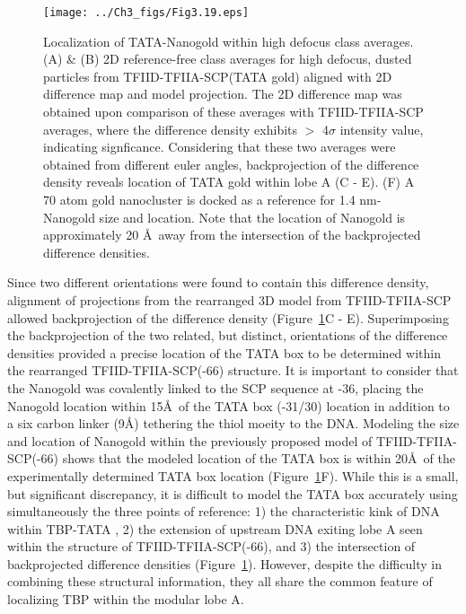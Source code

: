 \begin{figure}
\centering
\texttt{[image: ../Ch3\_figs/Fig3.19.eps]}
\caption[Localization of TATA-Nanogold within high defocus class averages]{Localization of TATA-Nanogold within high defocus class averages. (A) \& (B) 2D reference-free class averages for high defocus, dusted particles from TFIID-TFIIA-SCP(TATA gold) aligned with 2D difference map and model projection. The 2D difference map was obtained upon comparison of these averages with TFIID-TFIIA-SCP averages, where the difference density exhibits $>$ 4$\sigma$ intensity value, indicating signficance. Considering that these two averages were obtained from different euler angles, backprojection of the difference density reveals location of TATA gold within lobe A (C - E). (F) A 70 atom gold nanocluster \cite{Jadzinsky_2007} is docked as a reference for 1.4 nm-Nanogold size and location. Note that the location of Nanogold is approximately 20 \AA\ away from the intersection of the backprojected difference densities.}
\label{fig:Fig3.19}
\end{figure}
\indent Since two different orientations were found to contain this difference density, alignment of projections from the rearranged 3D model from TFIID-TFIIA-SCP allowed backprojection of the difference density (Figure~\ref{fig:Fig3.19}C - E). Superimposing the backprojection of the two related, but distinct, orientations of the difference densities provided a precise location of the TATA box to be determined within the rearranged TFIID-TFIIA-SCP(-66) structure. It is important to consider that the Nanogold was covalently linked to the SCP sequence at -36, placing the Nanogold location within 15\AA\ of the TATA box (-31/30) location in addition to a six carbon linker (9\AA) tethering the thiol moeity to the DNA. Modeling the size and location of Nanogold within the previously proposed model of TFIID-TFIIA-SCP(-66) shows that the modeled location of the TATA box is within 20\AA\ of the experimentally determined TATA box location (Figure~\ref{fig:Fig3.19}F). While this is a small, but significant discrepancy, it is difficult to model the TATA box accurately using simultaneously the three points of reference: 1) the characteristic kink of DNA within TBP-TATA \cite{Kim_3377,Kim_3416}, 2) the extension of upstream DNA exiting lobe A seen within the structure of TFIID-TFIIA-SCP(-66), and 3) the intersection of backprojected difference densities (Figure~\ref{fig:Fig3.19}). However, despite the difficulty in combining these structural information, they all share the common feature of localizing TBP within the modular lobe A. \\
